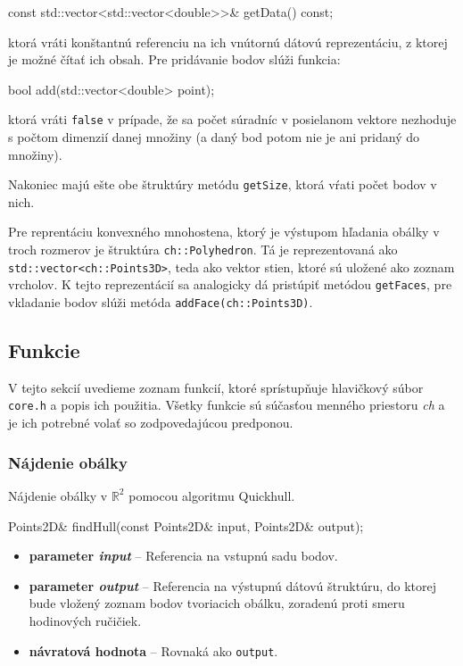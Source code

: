 \documentclass[a4paper, 12pt, slovak]{article}
\begin{document}
\begin{c++}
const std::vector<std::vector<double>>& getData() const;
\end{c++}

ktorá vráti konštantnú referenciu na ich vnútornú dátovú reprezentáciu, z ktorej je 
možné čítať ich obsah. Pre pridávanie bodov slúži funkcia:

\begin{c++}
bool add(std::vector<double> point);
\end{c++}

ktorá vráti \texttt{false} v prípade, že sa počet súradníc v posielanom vektore 
nezhoduje s počtom dimenzií danej množiny (a daný bod potom nie je ani pridaný do 
množiny).

Nakoniec majú ešte obe štruktúry metódu \texttt{getSize}, ktorá vŕati počet bodov v 
nich. 

Pre reprentáciu konvexného mnohostena, ktorý je výstupom hľadania obálky v troch 
rozmerov je štruktúra \texttt{ch::Polyhedron}. Tá je reprezentovaná ako 
\texttt{std::vector<ch::Points3D>}, teda ako vektor stien, ktoré sú uložené ako 
zoznam vrcholov. K tejto reprezentácií sa analogicky dá pristúpiť metódou 
\texttt{getFaces}, pre vkladanie bodov slúži metóda \texttt{addFace(ch::Points3D)}.

\subsection{Funkcie}
V tejto sekcií uvedieme zoznam funkcií, ktoré sprístupňuje hlavičkový súbor 
\texttt{core.h} a popis ich použitia. Všetky funkcie sú súčasťou menného priestoru 
\textit{ch} a je ich potrebné volať so zodpovedajúcou predponou.

\subsubsection{Nájdenie obálky}
Nájdenie obálky v $\mathbb{R}^2$ pomocou algoritmu Quickhull.

\begin{c++}
Points2D& findHull(const Points2D& input, Points2D& output);
\end{c++}

\begin {itemize}
 \item \textbf{parameter \textit{input}} -- Referencia na vstupnú sadu bodov. 
 \item \textbf{parameter \textit{output}} -- Referencia na výstupnú dátovú 
štruktúru, do ktorej bude vložený zoznam bodov tvoriacich obálku, zoradenú proti 
smeru hodinových ručičiek.
 \item \textbf{návratová hodnota} -- Rovnaká ako \texttt{output}.
\end {itemize}
\end{document}
